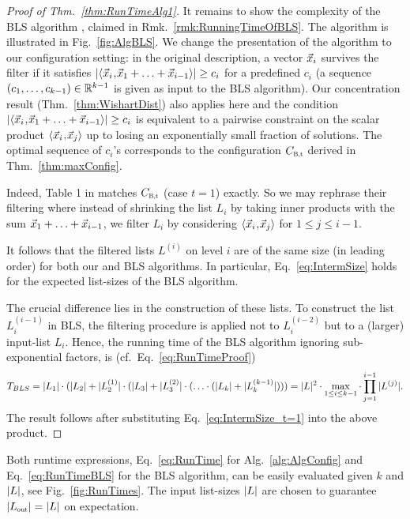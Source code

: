 \begin{proof}[Proof of Thm.~\ref{thm:RunTimeAlg1}]
    It remains to show the complexity of the BLS algorithm \cite{BLS16}, claimed in Rmk.~\ref{rmk:RunningTimeOfBLS}. The algorithm is illustrated in Fig.~\ref{fig:AlgBLS}. We change the presentation of the algorithm to our configuration setting: in the original description, a vector $\vec x_i$ survives the filter if it satisfies $\left| \langle\vec x_i\!\mathbin{,}\!\vec x_1 + \ldots + \vec x_{i-1}\rangle\right| \geq c_i$ for a predefined $c_i$ (a sequence $(c_1, \ldots, c_{k-1}) \in {{\mathbb R}}^{k-1}$ is given as input to the BLS algorithm). Our concentration result (Thm.~\ref{thm:WishartDist}) also applies here and the condition $\left| \langle\vec x_i\!\mathbin{,}\!\vec x_1 + \ldots + \vec x_{i-1}\rangle\right| \geq c_i$ is equivalent to a pairwise constraint on the scalar product $\langle\vec x_i\!\mathbin{,}\!\vec x_j\rangle$ up to losing an exponentially small fraction of solutions. The optimal sequence of $c_i$'s corresponds to the configuration $\Cbalt$ derived in Thm.~\ref{thm:maxConfig}.
    
    Indeed, Table 1 in \cite{BLS16} matches $\Cbalt$ (case $t=1$) exactly. So we may rephrase their filtering where instead of shrinking the list $L_i$ by taking inner products with the sum $\vec x_1+ \ldots + \vec x_{i-1}$, we filter $L_i$ by considering $\langle\vec x_i\!\mathbin{,}\!\vec x_j\rangle$ for $1 \leq j \leq i-1$. 
      
    It follows that the filtered lists $L^{(i)}$ on level $i$ are of the same size (in leading order) for both our and BLS algorithms.
    In particular, Eq.~\eqref{eq:IntermSize} holds for the expected list-sizes of the BLS algorithm.
    
    The crucial difference lies in the construction of these lists. To construct the list $L_i^{(i-1)}$ in BLS, the filtering procedure is applied not to $L_i^{(i-2)}$ but to a (larger) input-list $L_i$. Hence, the running time of the BLS algorithm ignoring sub-exponential factors, is (cf.\ Eq.~\eqref{eq:RunTimeProof})
      \begin{align*}
      	 T_{BLS} = 
      	 |L_1| \cdot (|L_2| + |L_2^{(1)}| \cdot ( |L_3| +|L_3^{(2)}|  \cdot(\ldots \cdot (|L_k| + |L_k^{(k-1)}| ) ))
    	 =
      	 |L|^2 \cdot \max\limits_{1 \leq i \leq k-1} \cdot \prod_{j=1}^{i-1} |L^{(j)}|.
      \end{align*}
    The result follows after substituting Eq.~\eqref{eq:IntermSize_t=1} into the above product. 
\end{proof}

Both runtime expressions, Eq.~\eqref{eq:RunTime} for Alg.~\ref{alg:AlgConfig} and Eq.~\eqref{eq:RunTimeBLS} for the BLS algorithm, can be easily evaluated given $k$ and $|L|$, see Fig.~\ref{fig:RunTimes}. The input list-sizes $|L|$ are chosen to guarantee $\normalabs{\Lout} = \normalabs{L}$ on expectation.

